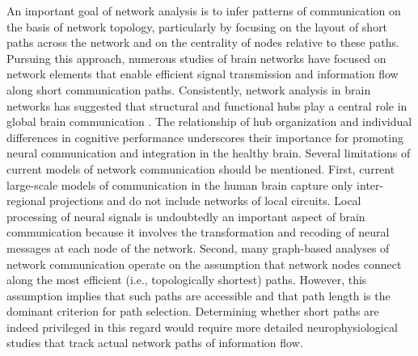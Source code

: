 \documentclass[9pt,twocolumn,twoside,lineno]{pnas-new}
\begin{document}
An important goal of network analysis is to infer patterns of
communication on the basis of network topology, particularly by focusing on the layout of short paths across the network and on the centrality of nodes relative to these paths. Pursuing this approach, numerous studies of brain networks have focused on network elements that enable efficient signal transmission and information flow along short communication paths. Consistently, network analysis in brain networks has suggested that structural and functional hubs play a central role in global brain communication \cite{structure-funct}. The relationship of hub organization and individual differences in cognitive performance \cite{intelll} underscores their importance for promoting neural communication and integration in the healthy brain. Several limitations of current models of network communication
should be mentioned. First, current large-scale models of communication in the human brain capture only inter-regional projections and do not include
networks of local circuits. Local processing of neural signals
is undoubtedly an important aspect of brain communication
because it involves the transformation and recoding of neural messages at each node of the network. Second, many graph-based analyses of network communication operate on the assumption that network nodes connect along the most efficient (i.e., topologically shortest) paths. However, this assumption implies that such paths are accessible and that path length is the dominant criterion for path selection. Determining whether short paths are indeed privileged in this regard would require more detailed neurophysiological studies that track actual network paths of information flow\cite{hubs}.
\end{document}
